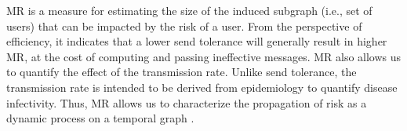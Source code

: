 \par MR is a measure for estimating the size of the induced subgraph (i.e., set of users) that can be impacted by the risk of a user. From the perspective of efficiency, it indicates that a lower send tolerance will generally result in higher MR, at the cost of computing and passing ineffective messages. MR also allows us to quantify the effect of the transmission rate. Unlike send tolerance, the transmission rate is intended to be derived from epidemiology to quantify disease infectivity. Thus, MR allows us to characterize the propagation of risk as a dynamic process on a temporal graph \cite{Barrat2013}.